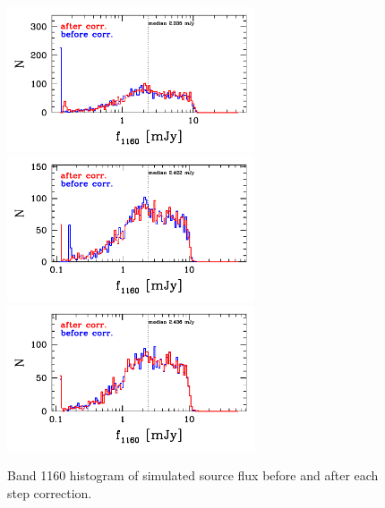 \documentclass[11pt,a4paper]{article}
\begin{document}
\begin{figure}[H]
	\caption{
		Band 1160 histogram of simulated source flux before and after each step correction. 
	}
	\includegraphics[width=0.65\textwidth]{galsim_1160_hist_flux_1}
	\includegraphics[width=0.65\textwidth]{galsim_1160_hist_flux_2}
	\includegraphics[width=0.65\textwidth]{galsim_1160_hist_flux_3}
\end{figure}
\end{document}
